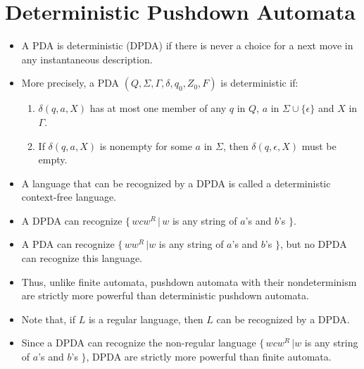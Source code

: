 \documentclass[]{article}
\begin{document}
\section{Deterministic Pushdown Automata}
  \begin{itemize}
    \item A PDA is deterministic (DPDA) if there is never a choice for a next 
    move in any instantaneous description.
    \item More precisely, a PDA $(Q,\Sigma,\Gamma,\delta,q_0,Z_0,F)$ is 
    deterministic if:
      \begin{enumerate}
        \item $\delta(q,a,X)$ has at most one member of any $q$ in $Q$, $a$ in 
        $\Sigma \cup \{\epsilon\}$ and $X$ in $\Gamma$.
        \item If $\delta(q,a,X)$ is nonempty for some $a$ in $\Sigma$, then 
        $\delta(q,\epsilon,X)$ must be empty.
      \end{enumerate}
    \item A language that can be recognized by a DPDA is called a deterministic 
    context-free language.
    \item A DPDA can recognize $\{ \, wcw^R \, | \, w$ is any string of $a$'s 
    and $b$'s $\}$.
    \item A PDA can recognize $\{ \, ww^R \, | w$ is any string of $a$'s and $b
    $'s $\}$, but no DPDA can recognize this language.
    \item Thus, unlike finite automata, pushdown automata with their 
    nondeterminism are strictly more powerful than deterministic pushdown 
    automata.
    \item Note that, if $L$ is a regular language, then $L$ can be recognized by 
    a DPDA.
    \item Since a DPDA can recognize the non-regular language $\{ \, wcw^R \, | 
    w$ is any string of $a$'s and $b$'s $\}$, DPDA are strictly more powerful 
    than finite automata.
  \end{itemize}
\end{document}
